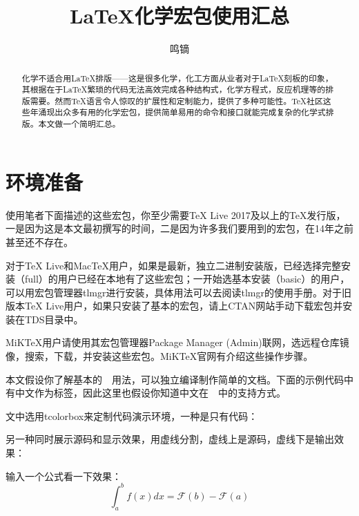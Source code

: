 \documentclass[a4paper,UTF8,zihao = -4]{ctexart} %
\title{\textsf{\LaTeX}\heiti 化学宏包使用汇总}
\author{\fangsong 鸣镝}
\date{\oldstylenums{2018/04/23}}
\begin{document}
\pagecolor{lightmilkyellow}
\pagestyle{plain}

\maketitle %

\begin{abstract} 化学不适合用\LaTeX{}排版——这是很多化学，化工方面从业者对于\LaTeX{}刻板的印象，其根据在于\LaTeX{}繁琐的代码无法高效完成各种结构式，化学方程式，反应机理等的排版需要。然而\TeX{}语言令人惊叹的扩展性和定制能力，提供了多种可能性。\TeX{}社区这些年涌现出众多有用的化学宏包，提供简单易用的命令和接口就能完成复杂的化学式排版。本文做一个简明汇总。
\end{abstract}

\section{环境准备}
\label{sec:envimtPrep}

使用笔者下面描述的这些宏包，你至少需要\TeX{} Live 2017及以上的\TeX{}发行版，一是因为这是本文最初撰写的时间，二是因为许多我们要用到的宏包，在14年之前甚至还不存在。

对于\TeX{} Live和Mac\TeX{}用户，如果是最新，独立二进制安装版，已经选择完整安装（full）的用户已经在本地有了这些宏包；一开始选基本安装（basic）的用户，可以用宏包管理器\textsf{tlmgr}进行安装，具体用法可以去阅读\textsf{tlmgr}的使用手册。对于旧版本\TeX{} Live用户，如果只安装了基本的宏包，请上CTAN网站手动下载宏包并安装在TDS目录中。

MiK\TeX{}用户请使用其宏包管理器\textsf{Package Manager (Admin)}联网，选远程仓库镜像，搜索，下载，并安装这些宏包。MiK\TeX{}官网有介绍这些操作步骤。

本文假设你了解基本的~\LaTeXe{}~用法，可以独立编译制作简单的文档。下面的示例代码中有中文作为标签，因此这里也假设你知道中文在~\LaTeXe{}~中的支持方式。

文中选用\textsf{tcolorbox}来定制代码演示环境，一种是只有代码：

\begin{dispListing}
\usepackage{tcolorbox} %
\end{dispListing}

另一种同时展示源码和显示效果，用虚线分割，虚线上是源码，虚线下是输出效果：

\begin{dispExample}
输入一个公式看一下效果：\[ \int _a^b f(x)dx = \mathcal{F}(b) - \mathcal{F}(a) \]
\end{dispExample}
\end{document}
